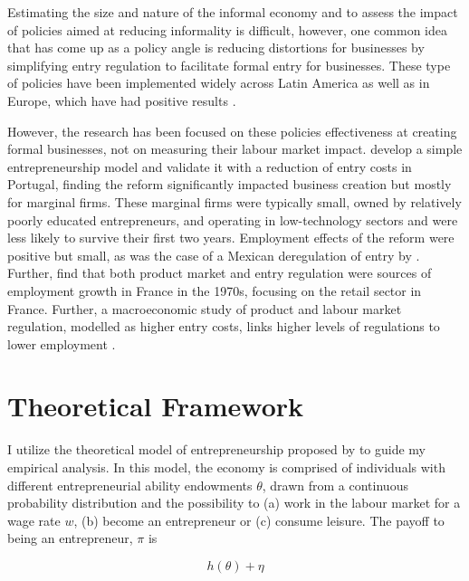 \documentclass[11pt,a4paper]{article}\usepackage[]{graphicx}\usepackage[]{xcolor}
\begin{document}
Estimating the size and nature of the informal economy and to assess the impact of policies aimed at reducing informality is difficult, however, one common idea that has come up as a policy angle is reducing distortions for businesses by simplifying entry regulation to facilitate formal entry for businesses. These type of policies have been implemented widely across Latin America as well as in Europe, which have had positive results \parencite{Oviedo.2009}. 

However, the research has been focused on these policies effectiveness at creating formal businesses, not on measuring their labour market impact. \textcite{Branstetter.2014} develop a simple entrepreneurship model and validate it with a reduction of entry costs in Portugal, finding the reform significantly impacted business creation but mostly for marginal firms. These marginal firms were typically small, owned by relatively poorly educated entrepreneurs, and operating in low-technology sectors and were less likely to survive their first two years. Employment effects of the reform were positive but small, as was the case of a Mexican deregulation of entry by \textcite{Kaplan.2011}. Further, \textcite{Bertrand.2002} find that both product market and entry regulation were sources of employment growth in France in the 1970s, focusing on the retail sector in France. Further, a macroeconomic study of product and labour market regulation, modelled as higher entry costs, links higher levels of regulations to lower employment \parencite{Blanchard.2003}. 

\section{Theoretical Framework}

I utilize the theoretical model of entrepreneurship proposed by \textcite{Branstetter.2014} to guide my empirical analysis. In this model, the economy is comprised of individuals with different entrepreneurial ability endowments $\theta$, drawn from a continuous probability distribution and the possibility to (a) work in the labour market for a wage rate $w$, (b) become an entrepreneur or (c) consume leisure. The payoff to being an entrepreneur, $\pi$ is

\begin{equation}
  h(\theta) + \eta
\end{equation}
\end{document}
